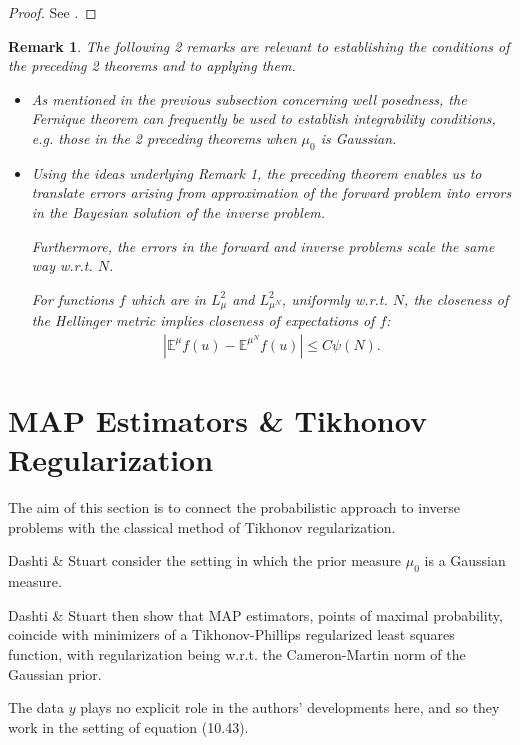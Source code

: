 \documentclass[oneside,11pt]{book}
\numberwithin{equation}{section}
\newtheorem{remark}{Remark}[section]
\begin{document}
\begin{proof}
    See \cite[pp. 356--358]{Dashti_Stuart2017}.
\end{proof}

\begin{remark}
    The following 2 remarks are relevant to establishing the conditions of the preceding 2 theorems and to applying them.
    \begin{itemize}
        \item As mentioned in the previous subsection concerning well posedness, the Fernique theorem can frequently be used to establish integrability conditions, e.g. those in the 2 preceding theorems when $\mu_0$ is Gaussian.
        \item Using the ideas underlying Remark 1, the preceding theorem enables us to translate errors arising from approximation of the forward problem into errors in the Bayesian solution of the inverse problem.
        
        Furthermore, the errors in the forward and inverse problems scale the same way w.r.t. $N$.
        
        For functions $f$ which are in $L_\mu^2$ and $L_{\mu^N}^2$, uniformly w.r.t. $N$, the closeness of the Hellinger metric implies closeness of expectations of $f$:
        \begin{align*}
            |\mathbb{E}^\mu f(u) - \mathbb{E}^{\mu^N}f(u)|\le C\psi(N).
        \end{align*}
    \end{itemize}
\end{remark}

\section{MAP Estimators \& Tikhonov Regularization}
The aim of this section is to connect the probabilistic approach to inverse problems with the classical method of Tikhonov regularization.

Dashti \& Stuart consider the setting in which the prior measure $\mu_0$ is a Gaussian measure.

Dashti \& Stuart then show that MAP estimators, points of maximal probability, coincide with minimizers of a Tikhonov-Phillips regularized least squares function, with regularization being w.r.t. the Cameron-Martin norm of the Gaussian prior.

The data $y$ plays no explicit role in the authors' developments here, and so they work in the setting of equation (10.43).
\end{document}
